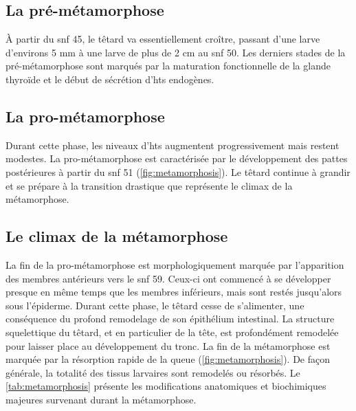 \documentclass[../main.tex]{subfiles}
\begin{document}
	\subsection{La pré-métamorphose}
		À partir du \gls{snf} 45, le têtard va essentiellement croître, passant d'une larve d'environs 5 mm à une larve de plus de 2 cm au \gls{snf} 50.
		Les derniers stades de la pré-métamorphose sont marqués par la maturation fonctionnelle de la glande thyroïde et le début de sécrétion d'\glspl{ht} endogènes.

		\subsection{La pro-métamorphose}
		Durant cette phase, les niveaux d'\glspl{ht} augmentent progressivement mais restent modestes.
		La pro-métamorphose est caractérisée par le développement des pattes postérieures à partir du \gls{snf} 51 (\autoref{fig:metamorphosis}).
		Le têtard continue à grandir et se prépare à la transition drastique que représente le climax de la métamorphose.

		

	\subsection{Le climax de la métamorphose}
		La fin de la pro-métamorphose est morphologiquement marquée par l'apparition des membres antérieurs vers le \gls{snf} 59.
		Ceux-ci ont commencé à se développer presque en même temps que les membres inférieurs, mais sont restés jusqu'alors sous l'épiderme.
		Durant cette phase, le têtard cesse de s'alimenter, une conséquence du profond remodelage de son épithélium intestinal.
		La structure squelettique du têtard, et en particulier de la tête, est profondément remodelée pour laisser place au développement du tronc.
		La fin de la métamorphose est marquée par la résorption rapide de la queue (\autoref{fig:metamorphosis}).
		De façon générale, la totalité des tissus larvaires sont remodelés ou résorbés. Le \autoref{tab:metamorphosis} présente les modifications anatomiques et biochimiques majeures survenant durant la métamorphose.

		
\end{document}
